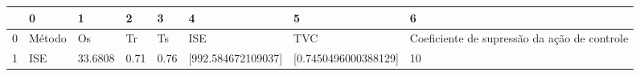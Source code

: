 \begin{tabular}{llllllll}
\toprule
{} &       0 &        1 &     2 &     3 &                   4 &                     5 &                                             6 \\
\midrule
0 &  Método &       Os &    Tr &    Ts &                 ISE &                   TVC &  Coeficiente de supressão da ação de controle \\
1 &     ISE &  33.6808 &  0.71 &  0.76 &  [992.584672109037] &  [0.7450496000388129] &                                            10 \\
\bottomrule
\end{tabular}
